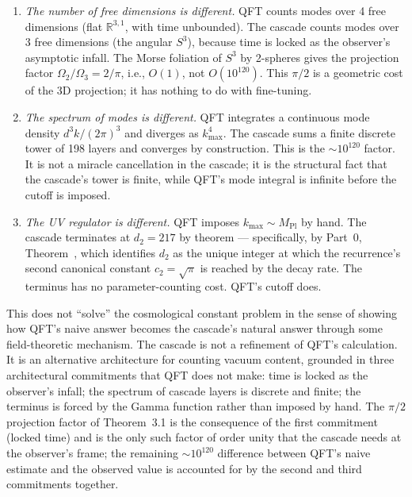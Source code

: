 \documentclass[11pt,a4paper]{article}
\begin{document}
\begin{enumerate}
\item \emph{The number of free dimensions is different.} QFT counts
modes over 4 free dimensions (flat $\mathbb{R}^{3,1}$, with time
unbounded). The cascade counts modes over 3 free dimensions (the
angular $S^3$), because time is locked as the observer's asymptotic
infall. The Morse foliation of $S^3$ by 2-spheres gives the
projection factor $\Omega_2/\Omega_3 = 2/\pi$, i.e., $O(1)$, not
$O(10^{120})$. This $\pi/2$ is a geometric cost of the 3D projection;
it has nothing to do with fine-tuning.
\item \emph{The spectrum of modes is different.} QFT integrates a
continuous mode density $d^3k/(2\pi)^3$ and diverges as
$k_{\max}^4$. The cascade sums a finite discrete tower of 198 layers
and converges by construction. This is the $\sim 10^{120}$ factor.
It is not a miracle cancellation in the cascade; it is the structural
fact that the cascade's tower is finite, while QFT's mode integral is
infinite before the cutoff is imposed.
\item \emph{The UV regulator is different.} QFT imposes $k_{\max}
\sim M_{\mathrm{Pl}}$ by hand. The cascade terminates at $d_2 = 217$
by theorem --- specifically, by Part~0, Theorem~, which identifies
$d_2$ as the unique integer at which the recurrence's second
canonical constant $c_2 = \sqrt{\pi}$ is reached by the decay rate.
The terminus has no parameter-counting cost. QFT's cutoff does.
\end{enumerate}

This does not ``solve'' the cosmological constant problem in the sense
of showing how QFT's naive answer becomes the cascade's natural answer
through some field-theoretic mechanism. The cascade is not a refinement
of QFT's calculation. It is an alternative architecture for counting
vacuum content, grounded in three architectural commitments that QFT
does not make: time is locked as the observer's infall; the spectrum
of cascade layers is discrete and finite; the terminus is forced by
the Gamma function rather than imposed by hand. The $\pi/2$ projection
factor of Theorem~3.1 is the consequence of the first commitment
(locked time) and is the only such factor of order unity that the
cascade needs at the observer's frame; the remaining $\sim 10^{120}$
difference between QFT's naive estimate and the observed value is
accounted for by the second and third commitments together.
\end{document}

